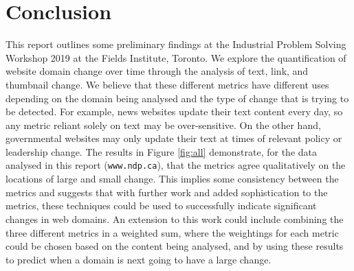 \documentclass[10pt, a4paper]{article}
\begin{document}
\section{Conclusion}
\vspace{-2mm}
 This report outlines some preliminary findings at the Industrial Problem Solving Workshop 2019 at the Fields Institute, Toronto.
 We explore the quantification of website domain change over time through the analysis of text, link, and thumbnail change.
 We believe that these different metrics have different uses depending on the domain being analysed and the type of change that is trying to be detected.
 For example, news websites update their text content every day, so any metric reliant solely on text may be over-sensitive.
 On the other hand, governmental websites may only update their text at times of relevant policy or leadership change.
 The results in Figure \ref{fig:all} demonstrate, for the data analysed in this report (\texttt{www.ndp.ca}), that the metrics agree qualitatively on the locations of large and small change.
 This implies some consistency between the metrics and suggests that with further work and added sophistication to the metrics, these techniques could be used to successfully indicate significant changes in web domains.
 An extension to this work could include combining the three different metrics in a weighted sum, where the weightings for each metric could be chosen based on the content being analysed, and by using these results to predict when a domain is next going to have a large change.



\end{document}
